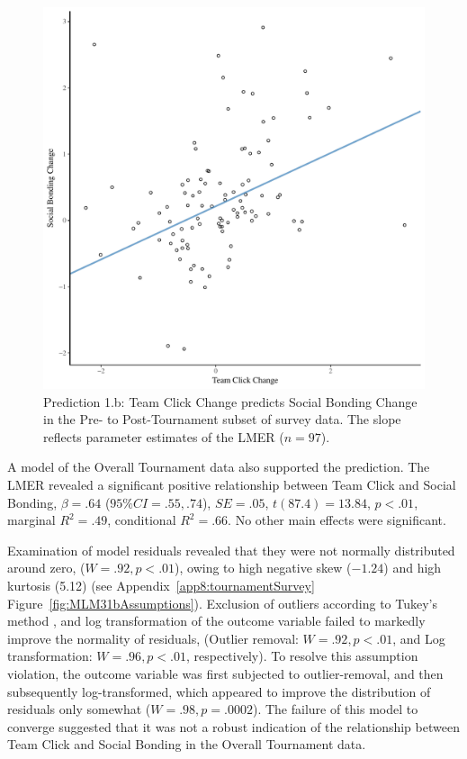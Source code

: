 \begin{CJK}{UTF8}{gbsn}
  \begin{figure}[htbp]
    \centering
  \includegraphics[scale=.5]{images/clickBondDeltaModelSlope.pdf}
    \caption{Prediction 1.b: Team Click Change predicts Social Bonding Change in the Pre- to Post-Tournament subset of survey data. The slope reflects parameter estimates of the LMER ($n = 97$).}
    \label{fig:clickBondDeltaModelSlope}
  \end{figure}


A model of the Overall Tournament data also supported the prediction. The LMER revealed a significant positive relationship between Team Click and Social Bonding, $\beta = .64$ ($95\% CI = .55, .74$), $SE = .05$, $t(87.4) = 13.84$, $p < .01$, marginal $R^2 = .49$, conditional $R^2 = .66$. No other main effects were significant.

Examination of model residuals revealed that they were not normally distributed around zero, ($W = .92, p < .01$), owing to high negative skew ($-1.24$) and high kurtosis (5.12) (see Appendix~\ref{app8:tournamentSurvey} Figure~\ref{fig:MLM31bAssumptions}).  Exclusion of outliers according to Tukey's method \citep[observations above and below 1.5x the Inter Quartile Range (IQR); see][]{Tukey1977}, and log transformation of the outcome variable  failed to markedly improve the normality of residuals, (Outlier removal: $W = .92, p < .01$, and Log transformation: $W = .96, p < .01$, respectively).  To resolve this assumption violation, the outcome variable was first subjected to outlier-removal, and then subsequently log-transformed, which appeared to improve the distribution of residuals only somewhat ($W = .98, p = .0002$).
The failure of this model to converge suggested that it was not a robust indication of the relationship between Team Click and Social Bonding in the Overall Tournament data.


\end{CJK}
